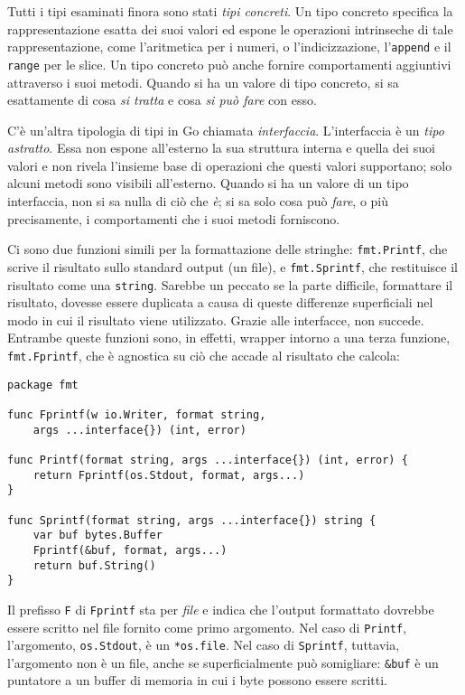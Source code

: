%
Tutti i tipi esaminati finora sono stati \textit{tipi concreti}.
Un tipo concreto specifica la rappresentazione esatta dei suoi valori ed espone le operazioni intrinseche di tale rappresentazione, come l'aritmetica per i numeri, o l'indicizzazione, l'\verb|append| e il \verb|range| per le slice.
Un tipo concreto può anche fornire comportamenti aggiuntivi attraverso i suoi metodi.
Quando si ha un valore di tipo concreto, si sa esattamente di cosa \textit{si tratta} e cosa \textit{si può fare} con esso.

C'è un'altra tipologia di tipi in Go chiamata \textit{interfaccia}.
L'interfaccia è un \textit{tipo astratto}.
Essa non espone all'esterno la sua struttura interna e quella dei suoi valori e non rivela l'insieme base di operazioni che questi valori supportano;
solo alcuni metodi sono visibili all'esterno.
Quando si ha un valore di un tipo interfaccia, non si sa nulla di ciò che \textit{è};
si sa solo cosa può \textit{fare}, o più precisamente, i comportamenti che i suoi metodi forniscono.

Ci sono due funzioni simili per la formattazione delle stringhe: \verb|fmt.Printf|, che scrive il risultato sullo standard output (un file), e \verb|fmt.Sprintf|, che restituisce il risultato come una \verb|string|.
Sarebbe un peccato se la parte difficile, formattare il risultato, dovesse essere duplicata a causa di queste differenze superficiali nel modo in cui il risultato viene utilizzato.
Grazie alle interfacce, non succede.
Entrambe queste funzioni sono, in effetti, wrapper intorno a una terza funzione, \verb|fmt.Fprintf|, che è agnostica su ciò che accade al risultato che calcola:
\begin{lstlisting}[frame=single, label={lst:lstlisting6-1.1}]
package fmt

func Fprintf(w io.Writer, format string,
    args ...interface{}) (int, error)

func Printf(format string, args ...interface{}) (int, error) {
    return Fprintf(os.Stdout, format, args...)
}

func Sprintf(format string, args ...interface{}) string {
    var buf bytes.Buffer
    Fprintf(&buf, format, args...)
    return buf.String()
}
\end{lstlisting}
Il prefisso \verb|F| di \verb|Fprintf| sta per \textit{file} e indica che l'output formattato dovrebbe essere scritto nel file fornito come primo argomento.
Nel caso di \verb|Printf|, l'argomento, \verb|os.Stdout|, è un \verb|*os.file|.
Nel caso di \verb|Sprintf|, tuttavia, l'argomento non è un file, anche se superficialmente può somigliare: \verb|&buf| è un puntatore a un buffer di memoria in cui i byte possono essere scritti.

